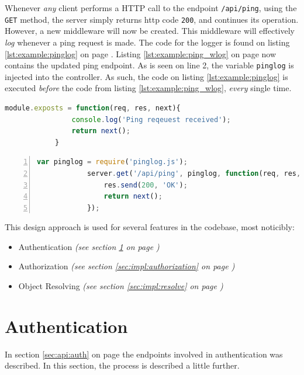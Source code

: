 		Whenever \emph{any} client performs a HTTP call to the endpoint \verb=/api/ping=, using the \verb=GET= method, the server simply returns http code \verb=200=, and continues its operation. However, a new middleware will now be created. This middleware will effectively \emph{log} whenever a ping request is made. The code for the logger is found on listing \ref{lst:example:pinglog} on page \pageref{lst:example:pinglog}. Listing \ref{lst:example:ping_wlog} on page \pageref{lst:example:ping_wlog} now contains the updated ping endpoint. As is seen on line 2, the variable \verb=pinglog= is injected into the controller. As such, the code on listing \ref{lst:example:pinglog} is executed \emph{before} the code from listing \ref{lst:example:ping_wlog}, \emph{every} single time.

		\begin{lstlisting}[gobble=12,language=JavaScript,caption={PingLog Middleware},label={lst:example:pinglog}]
            module.exposts = function(req, res, next){
                console.log('Ping reqeuest received');
                return next();
            }
		\end{lstlisting}

		\begin{lstlisting}[gobble=12,language=JavaScript,caption={Ping endpoint with the pinglog middleware},numbers=left,label={lst:example:ping_wlog}]
            var pinglog = require('pinglog.js');
            server.get('/api/ping', pinglog, function(req, res, next){
                res.send(200, 'OK');
                return next();
            });		
		\end{lstlisting}

		This design approach is used for several features in the codebase, most noticibly:
		\begin{itemize}
			\item Authentication \emph{(see section \ref{sec:impl:authentication} on page \pageref{sec:impl:authentication})}
			\item Authorization \emph{(see section \ref{sec:impl:authorization} on page \pageref{sec:impl:authorization})}
			\item Object Resolving \emph{(see section \ref{sec:impl:resolve} on page \pageref{sec:impl:resolve})}
		\end{itemize}

	\section{Authentication}
		\label{sec:impl:authentication}
		In section \ref{sec:api:auth} on page \pageref{sec:api:auth} the endpoints involved in authentication was described. In this section, the process is described a little further. 

